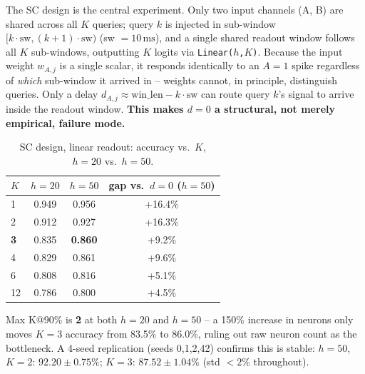 \documentclass[conference]{IEEEtran}
\begin{document}
The SC design is the central experiment. Only two input channels (A, B) are shared across all
$K$ queries; query $k$ is injected in sub-window $[k\!\cdot\!\text{sw}, (k\!+\!1)\!\cdot\!\text{sw})$
(sw $=10\,\mathrm{ms}$), and a single shared readout window follows all $K$ sub-windows,
outputting $K$ logits via \texttt{Linear($h$,$K$)}. Because the input weight
$w_{A,j}$ is a single scalar, it responds identically to an $A{=}1$ spike regardless of
\emph{which} sub-window it arrived in -- weights cannot, in principle, distinguish
queries. Only a delay $d_{A,j}\approx\text{win\_len}-k\cdot\text{sw}$ can route query
$k$'s signal to arrive inside the readout window. \textbf{This makes $d{=}0$ a
structural, not merely empirical, failure mode.}

\begin{table}[t]
\centering
\caption{SC design, linear readout: accuracy vs.\ $K$, $h{=}20$ vs.\ $h{=}50$.}
\label{tab:pland}
\begin{tabular}{lccc}
\toprule
$K$ & $h{=}20$ & $h{=}50$ & gap vs.\ $d{=}0$ ($h{=}50$) \\
\midrule
1 & 0.949 & 0.956 & +16.4\% \\
2 & 0.912 & 0.927 & +16.3\% \\
\textbf{3} & 0.835 & \textbf{0.860} & +9.2\% \\
4 & 0.829 & 0.861 & +9.6\% \\
6 & 0.808 & 0.816 & +5.1\% \\
12 & 0.786 & 0.800 & +4.5\% \\
\bottomrule
\end{tabular}
\end{table}

Max K@90\% is \textbf{2} at both $h{=}20$ and $h{=}50$ -- a 150\% increase in neurons
only moves $K{=}3$ accuracy from 83.5\% to 86.0\%, ruling out raw neuron count as the
bottleneck. A 4-seed replication (seeds 0,1,2,42) confirms this is stable: $h{=}50$,
$K{=}2$: $92.20\pm0.75\%$; $K{=}3$: $87.52\pm1.04\%$ (std $<2\%$ throughout).
\end{document}

